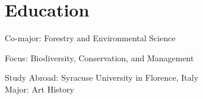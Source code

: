 \documentclass[]{baharmon-cv}
\begin{document}
{\vspace*{0.2cm}
\section{Education} 
\begin{minipage}[t]{0.80\textwidth} 
\end{minipage}
\begin{minipage}[t]{0.20\textwidth} 
\end{minipage}
Co-major: Forestry and Environmental Science
{\vspace*{0.1cm}

\begin{minipage}[t]{0.80\textwidth} 
\end{minipage}
\begin{minipage}[t]{0.20\textwidth} 
\end{minipage}
Focus: Biodiversity, Conservation, and Management
{\vspace*{0.1cm}

\begin{minipage}[t]{0.80\textwidth} 
\end{minipage}
\begin{minipage}[t]{0.20\textwidth} 
\end{minipage}
{\vspace*{0.1cm}

\begin{minipage}[t]{0.80\textwidth} 
\end{minipage}
\begin{minipage}[t]{0.20\textwidth} 
\end{minipage}
Study Abroad: Syracuse University in Florence, Italy \\
Major: Art History
{\vspace*{0.1cm}

\sectiondivider


}}}}}
\end{document}
